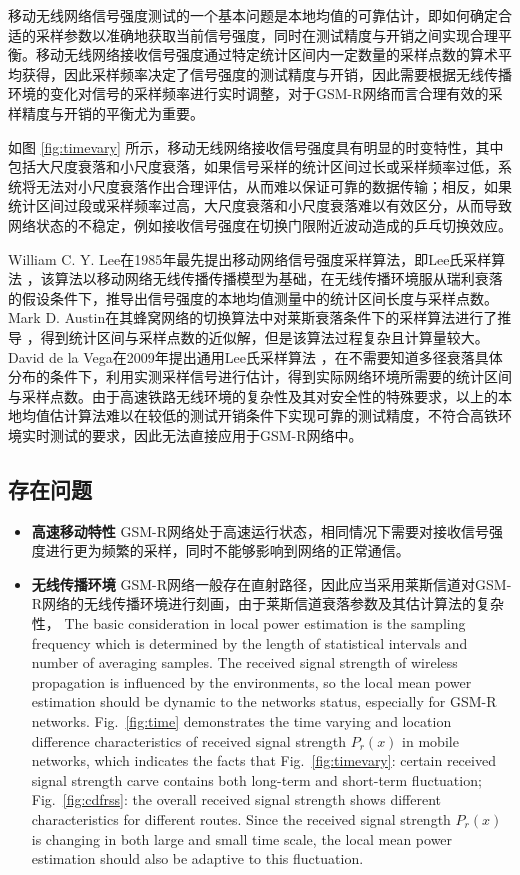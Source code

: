移动无线网络信号强度测试的一个基本问题是本地均值的可靠估计，即如何确定合适的采样参数以准确地获取当前信号强度，同时在测试精度与开销之间实现合理平衡。移动无线网络接收信号强度通过特定统计区间内一定数量的采样点数的算术平均获得，因此采样频率决定了信号强度的测试精度与开销，因此需要根据无线传播环境的变化对信号的采样频率进行实时调整，对于GSM-R网络而言合理有效的采样精度与开销的平衡尤为重要。

如图 \ref{fig:timevary} 所示，移动无线网络接收信号强度具有明显的时变特性，其中包括大尺度衰落和小尺度衰落，如果信号采样的统计区间过长或采样频率过低，系统将无法对小尺度衰落作出合理评估，从而难以保证可靠的数据传输；相反，如果统计区间过段或采样频率过高，大尺度衰落和小尺度衰落难以有效区分，从而导致网络状态的不稳定，例如接收信号强度在切换门限附近波动造成的乒乓切换效应。

William C. Y. Lee在1985年最先提出移动网络信号强度采样算法，即Lee氏采样算法 \cite{lee1985estimate}，该算法以移动网络无线传播传播模型为基础，在无线传播环境服从瑞利衰落的假设条件下，推导出信号强度的本地均值测量中的统计区间长度与采样点数。Mark D. Austin在其蜂窝网络的切换算法中对莱斯衰落条件下的采样算法进行了推导 \cite{Austin1994}，得到统计区间与采样点数的近似解，但是该算法过程复杂且计算量较大。David de la Vega在2009年提出通用Lee氏采样算法 \cite{Vega2009}，在不需要知道多径衰落具体分布的条件下，利用实测采样信号进行估计，得到实际网络环境所需要的统计区间与采样点数。由于高速铁路无线环境的复杂性及其对安全性的特殊要求，以上的本地均值估计算法难以在较低的测试开销条件下实现可靠的测试精度，不符合高铁环境实时测试的要求，因此无法直接应用于GSM-R网络中。

\subsection{存在问题}
\label{sec:prob3}

\begin{itemize}
  \item \textbf{高速移动特性}
  GSM-R网络处于高速运行状态，相同情况下需要对接收信号强度进行更为频繁的采样，同时不能够影响到网络的正常通信。
  \item \textbf{无线传播环境}
  GSM-R网络一般存在直射路径，因此应当采用莱斯信道对GSM-R网络的无线传播环境进行刻画，由于莱斯信道衰落参数及其估计算法的复杂性，
  The basic consideration in local power estimation is the sampling frequency which is determined by the length of statistical intervals and number of averaging samples. The received signal strength of wireless propagation is influenced by the environments, so the local mean power estimation should be dynamic to the networks status, especially for GSM-R networks. Fig.~\ref{fig:time} demonstrates the time varying and location difference characteristics of received signal strength $P_r(x)$ in mobile networks, which indicates the facts that Fig.~\ref{fig:timevary}: certain received signal strength carve contains both long-term and short-term fluctuation; Fig.~\ref{fig:cdfrss}: the overall received signal strength shows different characteristics for different routes. Since the received signal strength $P_r(x)$ is changing in both large and small time scale, the local mean power estimation should also be adaptive to this fluctuation.
\end{itemize}

